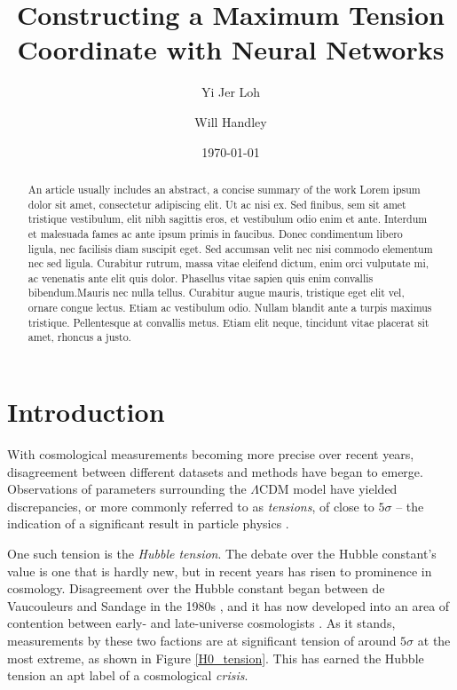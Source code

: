 \documentclass[%
 reprint,
 amsmath,amssymb,
 aps,
]{revtex4-2}
\begin{document}

\title{Constructing a Maximum Tension Coordinate with Neural Networks}

\author{Yi Jer Loh}
\author{Will Handley}
%

\date{\today}

\begin{abstract}
An article usually includes an abstract, a concise summary of the work
Lorem ipsum dolor sit amet, consectetur adipiscing elit. Ut ac nisi ex. Sed finibus, sem sit amet tristique vestibulum, elit nibh sagittis eros, et vestibulum odio enim et ante. Interdum et malesuada fames ac ante ipsum primis in faucibus. Donec condimentum libero ligula, nec facilisis diam suscipit eget. Sed accumsan velit nec nisi commodo elementum nec sed ligula. Curabitur rutrum, massa vitae eleifend dictum, enim orci vulputate mi, ac venenatis ante elit quis dolor. Phasellus vitae sapien quis enim convallis bibendum.Mauris nec nulla tellus. Curabitur augue mauris, tristique eget elit vel, ornare congue lectus. Etiam ac vestibulum odio. Nullam blandit ante a turpis maximus tristique. Pellentesque at convallis metus. Etiam elit neque, tincidunt vitae placerat sit amet, rhoncus a justo. 
\end{abstract}

\maketitle



\section{Introduction} \label{intro}

With cosmological measurements becoming more precise over recent years, disagreement between different datasets and methods have began to emerge. Observations of parameters surrounding the $\Lambda \textrm{CDM}$ model have yielded discrepancies, or more commonly referred to as \textit{tensions}, of close to $5\sigma$ -- the indication of a significant result in particle physics \cite{Franklin2013}. 

One such tension is the \textit{Hubble tension}. The debate over the Hubble constant's value is one that is hardly new, but in recent years has risen to prominence in cosmology. Disagreement over the Hubble constant began between de Vaucouleurs and Sandage in the 1980s \cite{deVaucouleurs1986, Sandage1975}, and it has now developed into an area of contention between early- and late-universe cosmologists \cite{Planck2020, Abbott2018, Freedman2020, Riess2019, Wong2019}. As it stands, measurements by these two factions are at significant tension of around $5\sigma$ at the most extreme, as shown in Figure \ref{H0_tension}. This has earned the Hubble tension an apt label of a cosmological \textit{crisis}.
\end{document}
